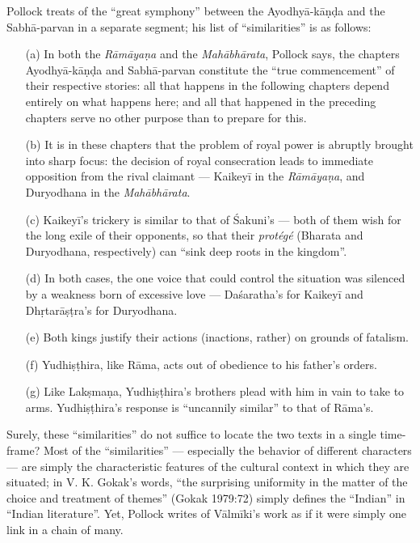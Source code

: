 Pollock treats of the “great symphony” between the Ayodhyā-kāṇḍa and the Sabhā-parvan in a separate segment; his list of “similarities” is as follows: 
\begin{itemize}
\item[(a)] In both the {\sl Rāmāyaṇa} and the {\sl Mahābhārata}, Pollock says, the chapters Ayodhyā-kāṇḍa and Sabhā-parvan constitute the “true commencement” of their respective stories: all that happens in the following chapters depend entirely on what happens here; and all that happened in the preceding chapters serve no other purpose than to prepare for this.

\item[(b)] It is in these chapters that the problem of royal power is abruptly brought into sharp focus: the decision of royal consecration leads to immediate opposition from the rival claimant --- Kaikeyī in the {\sl Rāmāyaṇa}, and Duryodhana in the {\sl Mahābhārata}. 

\item[(c)] Kaikeyī’s trickery is similar to that of Śakuni’s --- both of them wish for the long exile of their opponents, so that their {\sl protégé} (Bharata and Duryodhana, respectively) can “sink deep roots in the kingdom”. 

\newpage

\item[(d)] In both cases, the one voice that could control the situation was silenced by a weakness born of excessive love --- Daśaratha’s for Kaikeyī and Dhṛtarāṣṭra’s for Duryodhana.  

\item[(e)] Both kings justify their actions (inactions, rather) on grounds of fatalism.

\item[(f)] Yudhiṣṭhira, like Rāma, acts out of obedience to his father’s orders. 

\item[(g)] Like Lakṣmaṇa, Yudhiṣṭhira’s brothers plead with him in vain to take to arms. Yudhiṣṭhira’s response is “uncannily similar” to that of Rāma’s.  
\end{itemize}

Surely, these “similarities” do not suffice to locate the two texts in a single time-frame? Most of the “similarities” --- especially the behavior of different characters --- are simply the characteristic features of the cultural context in which they are situated; in V. K. Gokak’s words, “the surprising uniformity in the matter of the choice and treatment of themes” (Gokak 1979:72) simply defines the “Indian” in “Indian literature”. Yet, Pollock writes of Vālmīki’s work as if it were simply one link in a chain of many. 

